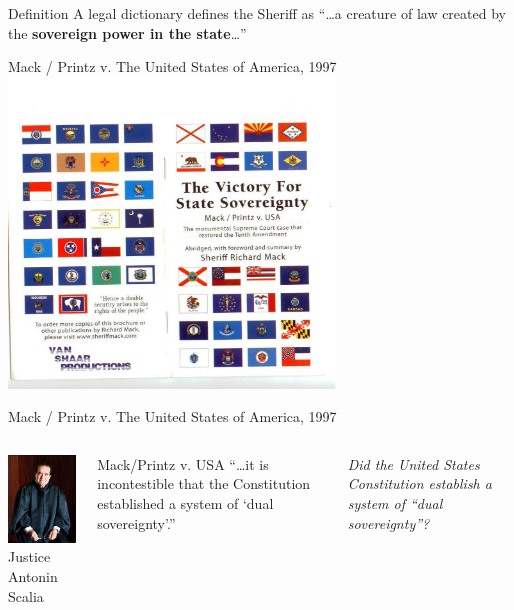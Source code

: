 \begin{frame}
    \begin{varblock}[0.8\textwidth]{Definition}
        A legal dictionary defines the Sheriff as ``\ldots a creature of law created by the \textbf{sovereign power in the state}\ldots'' 
    \end{varblock}
\end{frame}

\begin{frame}{Mack / Printz v. The United States of America, 1997}
    \centering
    \includegraphics[width=0.65\textwidth]{img/printz-mack.jpg} \\
\end{frame}

\begin{frame}{Mack / Printz v. The United States of America, 1997}
    \begin{columns}[onlytextwidth]
            \centering
            \includegraphics[height=0.75\textheight]{img/scalia.jpg} \\
            Justice Antonin Scalia \\

            \begin{block}{Mack/Printz v. USA}
                ``\ldots it is incontestible that the Constitution established a system of `dual sovereignty'.''
            \end{block}
            \pause
            {
                \color{red}
                \emph{Did the United States Constitution establish a system of ``dual sovereignty''?}
            }
    \end{columns}
\end{frame}

